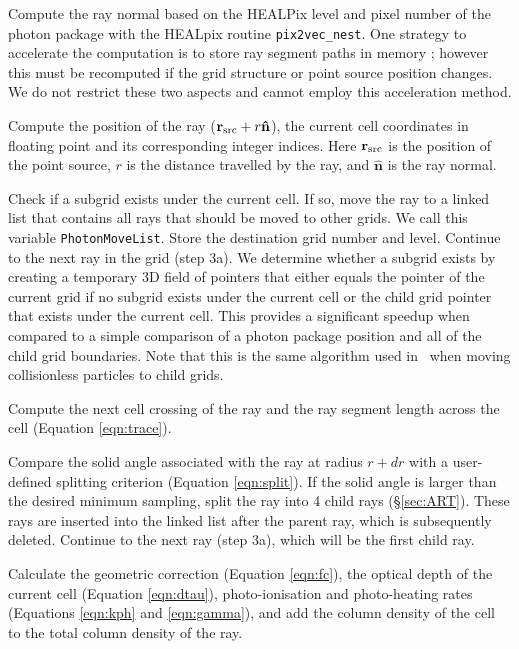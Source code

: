 \documentclass[useAMS,usenatbib]{mn2e}
\begin{document}
 Compute the ray normal based on the HEALPix level and pixel
number of the photon package with the HEALpix routine
\texttt{pix2vec\_nest}.  One strategy to accelerate the computation is
to store ray segment paths in memory \citep{Abel02_RT,
  Krumholz07_ART}; however this must be recomputed if the grid
structure or point source position changes.  We do not restrict these
two aspects and cannot employ this acceleration method.

 Compute the position of the ray ($\mathbf{r}_{\rm src} + r
\mathbf{\hat{n}}$), the current cell coordinates in floating point and
its corresponding integer indices.  Here $\mathbf{r}_{\rm src}$ is the
position of the point source, $r$ is the distance travelled by the
ray, and $\mathbf{\hat{n}}$ is the ray normal.

 Check if a subgrid exists under the current cell.  If so,
move the ray to a linked list that contains all rays that should be
moved to other grids.  We call this variable \texttt{PhotonMoveList}.
Store the destination grid number and level.  Continue to the next ray
in the grid (step 3a).  We determine whether a subgrid exists by
creating a temporary 3D field of pointers that either equals the
pointer of the current grid if no subgrid exists under the current
cell or the child grid pointer that exists under the current cell.
This provides a significant speedup when compared to a simple
comparison of a photon package position and all of the child grid
boundaries.  Note that this is the same algorithm used in \enzo~when
moving collisionless particles to child grids.

 Compute the next cell crossing of the ray and the ray
segment length across the cell (Equation \ref{eqn:trace}).

 Compare the solid angle associated with the ray at radius
$r+dr$ with a user-defined splitting criterion (Equation
\ref{eqn:split}).  If the solid angle is larger than the desired
minimum sampling, split the ray into 4 child rays (\S\ref{sec:ART}).
These rays are inserted into the linked list after the parent ray,
which is subsequently deleted.  Continue to the next ray (step 3a),
which will be the first child ray.

 Calculate the geometric correction (Equation \ref{eqn:fc}),
the optical depth of the current cell (Equation \ref{eqn:dtau}),
photo-ionisation and photo-heating rates (Equations \ref{eqn:kph} and
\ref{eqn:gamma}), and add the column density of the cell to the total
column density of the ray.
\end{document}
